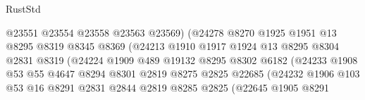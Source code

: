 \begin{lexlean}{RustStd}
\begin{coremodule}
                                      @23551
                                      @23554
                                      @23558
                                      @23563
                                      @23569)
                                    (@24278
                                      @8270
                                      @1925
                                      @1951
                                      @13
                                      @8295
                                      @8319
                                      @8345
                                      @8369
                                      (@24213
                                        @1910
                                        @1917
                                        @1924
                                        @13
                                        @8295
                                        @8304
                                        @2831
                                        @8319
                                        (@24224
                                          @1909
                                          @489
                                          @19132
                                          @8295
                                          @8302
                                          @6182
                                          (@24233
                                            @1908
                                            @53
                                            @55
                                            @4647
                                            @8294
                                            @8301
                                            @2819
                                            @8275
                                            @2825
                                            @22685
                                            (@24232
                                              @1906
                                              @103
                                              @53
                                              @16
                                              @8291
                                              @2831
                                              @2844
                                              @2819
                                              @8285
                                              @2825
                                              (@22645
                                                @1905
                                                @8291

\end{coremodule}
\end{lexlean}

